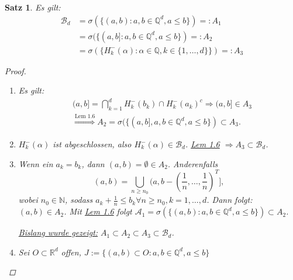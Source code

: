 \documentclass[a4paper]{scrreprt}
\newcommand{\R}{\mathbb{R}}
\newcommand{\N}{\mathbb{N}}
\newcommand{\Q}{\mathbb{Q}}
\newcommand{\Borel}{\mathcal{B}}
\newcommand{\Bd}{\Borel_d}
\newcommand{\jlabel}[1]{\label{j_#1}}
\newcommand{\jshortlink}[1]{\jhyperref{#1}{\text{#1}}}
\newcommand{\jhyperref}[2]{\hyperref[j_#1]{#2}}
\newcommand{\jlink}[1]{\jhyperref{#1}{#1}}
\theoremstyle{plain}
\newtheorem{satz}[thm]{Satz}
\theoremstyle{definition}
\begin{document}
{\begin{satz}
\jlabel{Satz 1.9}
    Es gilt:
    \begin{displaymath}
        \begin{split}{}
            \Bd & = \sigma(\{(a,b): a,b \in \Q^d, a \le b\}) =: A_1 \\
                & = \sigma(\{(a,b]: a,b \in \Q^d, a \le b\}) =: A_2 \\
                & = \sigma(\{H_k^-(\alpha): \alpha \in \Q, k \in \{1, \dots, d\}\}) =: A_3
        \end{split}
    \end{displaymath}
    \begin{proof}
        \begin{enumerate}
            \item Es gilt:
            \begin{displaymath}
                \begin{split}
                    &(a,b] = \bigcap_{k=1}^d H_k^-(b_k) \cap H_k^-(a_k)^c \Rightarrow (a,b] \in A_3\\
                    &\overset{\jshortlink{Lem 1.6}}{\Rightarrow} A_2 = \sigma(\{(a,b], a,b \in \Q^d, a \le b\}) \subset A_3.
                \end{split}                
            \end{displaymath}
            \item $H_k^-(\alpha)$ ist abgeschlossen, also $H_k^-(\alpha) \in \Bd$. \jlink{Lem 1.6} $\Rightarrow A_3 \subset \Bd$.
            \item Wenn ein $a_k = b_k$, dann $(a,b)=\emptyset \in A_2$. Anderenfalls
            \begin{displaymath}
                (a,b) = \bigcup_{n \ge n_0} (a, b -\left(\frac{1}{n}, \dots, \frac{1}{n}\right)^T],
            \end{displaymath}
            wobei $n_0\in\N$, sodass $a_k + \frac{1}{n} \le b_k \forall n \ge n_0, k=1,\dots, d$. Dann folgt: $(a,b) \in A_2$. Mit \jlink{Lem 1.6} folgt $\mathcal{A}_1 = \sigma(\{(a,b) : a,b \in \Q^d, a \le b\}) \subset A_2$.
            
            \vspace{12pt}
            
            \uline{Bislang wurde gezeigt:} $A_1 \subset A_2 \subset A_3 \subset \Bd$.
            \item
                Sei $O \subset \R^d$ offen, $J := \{(a,b) \subset O : a,b \in \Q^d, a\le b\}$
                

\end{enumerate}
\end{proof}
\end{satz}}
\end{document}
